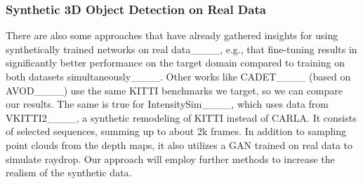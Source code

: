 \subsubsection{Synthetic 3D Object Detection on Real Data}
There are also some approaches that have already gathered insights for using synthetically trained networks on real data____, e.g., that fine-tuning results in significantly better performance on the target domain compared to training on both datasets simultaneously____.
Other works like CADET____ (based on AVOD____) use the same KITTI benchmarks we target, so we can compare our results.
The same is true for IntensitySim____, which uses data from VKITTI2____, a synthetic remodeling of KITTI instead of CARLA.
It consists of selected sequences, summing up to about 2k frames.
In addition to sampling point clouds from the depth maps, it also utilizes a GAN trained on real data to simulate raydrop.
Our approach will employ further methods to increase the realism of the synthetic data.